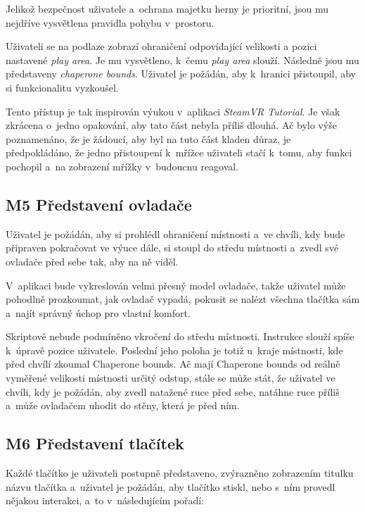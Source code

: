 Jelikož bezpečnost uživatele a~ochrana majetku herny je prioritní, jsou mu nejdříve
vysvětlena pravidla pohybu v~prostoru.

Uživateli se na podlaze zobrazí ohraničení odpovídající velikosti a
pozici nastavené \emph{play area}. Je mu vysvětleno, k~čemu \emph{play
area} slouží. Následně jsou mu představeny \emph{chaperone bounds}.
Uživatel je požádán, aby k~hranici přistoupil, aby si funkcionalitu
vyzkoušel.

Tento přístup je tak inspirován výukou v~aplikaci \emph{SteamVR
Tutorial}. Je však zkrácena o~jedno opakování, aby tato část nebyla
příliš dlouhá. Ač bylo výše poznamenáno, že je žádoucí, aby byl na tuto
část kladen důraz, je předpokládáno, že jedno přistoupení k~mřížce uživateli
stačí k~tomu, aby funkci pochopil a~na zobrazení mřížky v~budoucnu
reagoval.

\subsection{M5 Představení
ovladače}\label{m5-pux159edstavenuxed-ovladaux10de}

Uživatel je požádán, aby si prohlédl ohraničení místnosti a~ve chvíli,
kdy bude připraven pokračovat ve výuce dále, si stoupl do středu
místnosti a~zvedl své ovladače před sebe tak, aby na ně viděl.

V~aplikaci bude vykreslován velmi přesný model ovladače, takže uživatel
může pohodlně prozkoumat, jak ovladač vypadá, pokusit se nalézt všechna
tlačítka sám a~najít správný úchop pro vlastní komfort.

Skriptově nebude podmíněno vkročení do středu místnosti.
Instrukce slouží spíše k~úpravě pozice uživatele. Poslední jeho poloha
je totiž u~kraje místnosti, kde před chvílí zkoumal Chaperone
bounds. Ač mají Chaperone bounds od reálně vyměřené velikosti místnosti
určitý odstup, stále se může stát, že uživatel ve chvíli, kdy je
požádán, aby zvedl natažené ruce před sebe, natáhne ruce příliš a~může
ovladačem uhodit do stěny, která je před ním.

\subsection{M6 Představení
tlačítek}\label{m6-pux159edstavenuxed-tlaux10duxedtek}

Každé tlačítko je uživateli postupně představeno, zvýrazněno zobrazením
titulku názvu tlačítka a~uživatel je požádán, aby tlačítko stiskl, nebo s~ním
provedl nějakou interakci, a~to v~následujícím pořadí:

